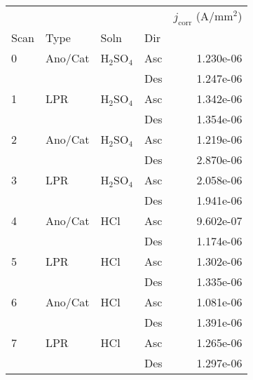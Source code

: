 \begin{tabular}{llllr}
\toprule
  &     &     &     &  $j_{\text{corr}}$ (A/mm$^2$) \\
Scan & Type & Soln & Dir &                               \\
\midrule
0 & Ano/Cat & H$_2$SO$_4$ & Asc &                     1.230e-06 \\
  &     &     & Des &                     1.247e-06 \\
1 & LPR & H$_2$SO$_4$ & Asc &                     1.342e-06 \\
  &     &     & Des &                     1.354e-06 \\
2 & Ano/Cat & H$_2$SO$_4$ & Asc &                     1.219e-06 \\
  &     &     & Des &                     2.870e-06 \\
3 & LPR & H$_2$SO$_4$ & Asc &                     2.058e-06 \\
  &     &     & Des &                     1.941e-06 \\
4 & Ano/Cat & HCl & Asc &                     9.602e-07 \\
  &     &     & Des &                     1.174e-06 \\
5 & LPR & HCl & Asc &                     1.302e-06 \\
  &     &     & Des &                     1.335e-06 \\
6 & Ano/Cat & HCl & Asc &                     1.081e-06 \\
  &     &     & Des &                     1.391e-06 \\
7 & LPR & HCl & Asc &                     1.265e-06 \\
  &     &     & Des &                     1.297e-06 \\
\bottomrule
\end{tabular}
